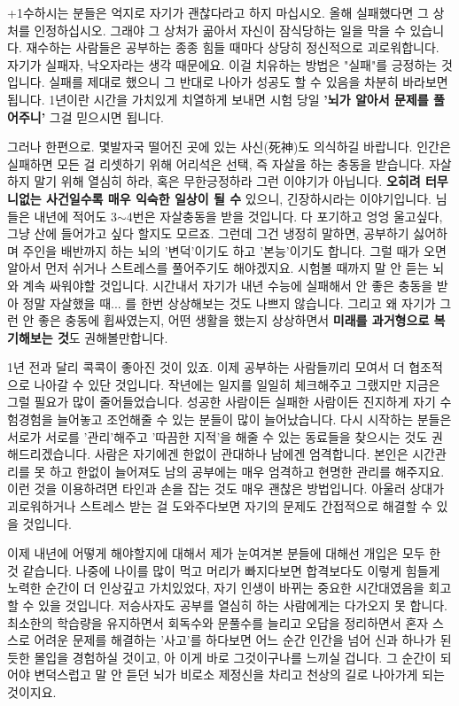 +1수하시는 분들은 억지로 자기가 괜찮다라고 하지 마십시오.
올해 실패했다면 그 상처를 인정하십시오. 그래야 그 상처가 곪아서 자신이 잠식당하는 일을 막을 수 있습니다.
재수하는 사람들은 공부하는 종종 힘들 때마다 상당히 정신적으로 괴로워합니다. 자기가 실패자, 낙오자라는 생각 때문에요.
이걸 치유하는 방법은 "실패"를 긍정하는 것입니다. 실패를 제대로 했으니 그 반대로 나아가 성공도 할 수 있음을 차분히 바라보면 됩니다.
1년이란 시간을 가치있게 치열하게 보내면 시험 당일 \textbf{'뇌가 알아서 문제를 풀어주니'} 그걸 믿으시면 됩니다.
\vspace{5mm}

그러나 한편으로. 몇발자국 떨어진 곳에 있는 사신(死神)도 의식하길 바랍니다.
인간은 실패하면 모든 걸 리셋하기 위해 어리석은 선택, 즉 자살을 하는 충동을 받습니다.
자살하지 말기 위해 열심히 하라, 혹은 무한긍정하라 그런 이야기가 아닙니다.
\textbf{오히려 터무니없는 사건일수록 매우 익숙한 일상이 될 수} 있으니, 긴장하시라는 이야기입니다.
님들은 내년에 적어도 3$\sim$4번은 자살충동을 받을 것입니다. 다 포기하고 엉엉 울고싶다, 그냥 산에 들어가고 싶다 할지도 모르죠.
그런데 그건 냉정히 말하면, 공부하기 싫어하며 주인을 배반까지 하는 뇌의 '변덕'이기도 하고 '본능'이기도 합니다.
그럴 때가 오면 알아서 먼저 쉬거나 스트레스를 풀어주기도 해야겠지요. 시험볼 때까지 말 안 듣는 뇌와 계속 싸워야할 것입니다.
시간내서 자기가 내년 수능에 실패해서 안 좋은 충동을 받아 정말 자살했을 때... 를 한번 상상해보는 것도 나쁘지 않습니다.
그리고 왜 자기가 그런 안 좋은 충동에 휩싸였는지, 어떤 생활을 했는지 상상하면서 \textbf{미래를 과거형으로 복기해보는 것}도 권해볼만합니다.
\vspace{5mm}

1년 전과 달리 콕콕이 좋아진 것이 있죠. 이제 공부하는 사람들끼리 모여서 더 협조적으로 나아갈 수 있단 것입니다.
작년에는 일지를 일일히 체크해주고 그랬지만 지금은 그럴 필요가 많이 줄어들었습니다.
성공한 사람이든 실패한 사람이든 진지하게 자기 수험경험을 늘어놓고 조언해줄 수 있는 분들이 많이 늘어났습니다.
다시 시작하는 분들은 서로가 서로를 '관리'해주고 '따끔한 지적'을 해줄 수 있는 동료들을 찾으시는 것도 권해드리겠습니다.
사람은 자기에겐 한없이 관대하나 남에겐 엄격합니다.
본인은 시간관리를 못 하고 한없이 늘어져도 남의 공부에는 매우 엄격하고 현명한 관리를 해주지요.
이런 것을 이용하려면 타인과 손을 잡는 것도 매우 괜찮은 방법입니다.
아울러 상대가 괴로워하거나 스트레스 받는 걸 도와주다보면 자기의 문제도 간접적으로 해결할 수 있을 것입니다.
\vspace{5mm}

이제 내년에 어떻게 해야할지에 대해서 제가 눈여겨본 분들에 대해선 개입은 모두 한 것 같습니다.
나중에 나이를 많이 먹고 머리가 빠지다보면
합격보다도 이렇게 힘들게 노력한 순간이 더 인상깊고 가치있었다, 자기 인생이 바뀌는 중요한 시간대였음을 회고할 수 있을 것입니다.
저승사자도 공부를 열심히 하는 사람에게는 다가오지 못 합니다.
최소한의 학습량을 유지하면서 회독수와 문풀수를 늘리고 오답을 정리하면서 혼자 스스로 어려운 문제를 해결하는 '사고'를 하다보면
어느 순간 인간을 넘어 신과 하나가 된 듯한 몰입을 경험하실 것이고, 아 이게 바로 그것이구나를 느끼실 겁니다.
그 순간이 되어야 변덕스럽고 말 안 듣던 뇌가 비로소 제정신을 차리고 천상의 길로 나아가게 되는 것이지요.
\vspace{5mm}

